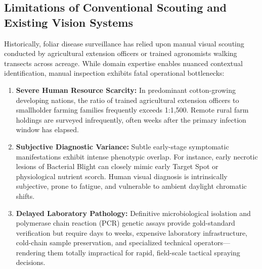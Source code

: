 \documentclass[journal,10pt,twocolumn]{IEEEtran}
\begin{document}
\subsection{Limitations of Conventional Scouting and Existing Vision Systems}
Historically, foliar disease surveillance has relied upon manual visual scouting conducted by agricultural extension officers or trained agronomists walking transects across acreage. While domain expertise enables nuanced contextual identification, manual inspection exhibits fatal operational bottlenecks:
\begin{enumerate}[leftmargin=*]
    \item \textbf{Severe Human Resource Scarcity:} In predominant cotton-growing developing nations, the ratio of trained agricultural extension officers to smallholder farming families frequently exceeds 1:1,500. Remote rural farm holdings are surveyed infrequently, often weeks after the primary infection window has elapsed.
    \item \textbf{Subjective Diagnostic Variance:} Subtle early-stage symptomatic manifestations exhibit intense phenotypic overlap. For instance, early necrotic lesions of Bacterial Blight can closely mimic early Target Spot or physiological nutrient scorch. Human visual diagnosis is intrinsically subjective, prone to fatigue, and vulnerable to ambient daylight chromatic shifts.
    \item \textbf{Delayed Laboratory Pathology:} Definitive microbiological isolation and polymerase chain reaction (PCR) genetic assays provide gold-standard verification but require days to weeks, expensive laboratory infrastructure, cold-chain sample preservation, and specialized technical operators---rendering them totally impractical for rapid, field-scale tactical spraying decisions.
\end{enumerate}
\end{document}
